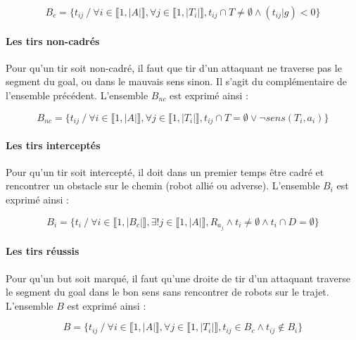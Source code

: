 \documentclass{article}
\begin{document}
\begin{equation*}
    B_c = \{ t_{ij} \ / \ \forall i \in \llbracket 1, |A| \rrbracket, \forall j \in \llbracket 1, |T_i| \rrbracket, t_{ij} \cap T \ne \emptyset \wedge (t_{ij}|g) < 0  \}
\end{equation*}


\paragraph{Les tirs non-cadrés}
Pour qu'un tir soit non-cadré, il faut que tir d'un attaquant ne traverse pas le segment du goal, ou dans le mauvais sens sinon. Il s'agit du complémentaire de l'ensemble précédent. L'ensemble $B_{nc}$ est exprimé ainsi :

\begin{equation*}
    B_{nc} = \{ t_{ij} \ / \ \forall i \in \llbracket 1, |A| \rrbracket, \forall j \in \llbracket 1, |T_i| \rrbracket, t_{ij} \cap T = \emptyset \vee \neg sens(T_i, a_i) \}
\end{equation*}

\paragraph{Les tirs interceptés}
Pour qu'un tir soit intercepté, il doit dans un premier temps être cadré et rencontrer un obstacle sur le chemin (robot allié ou adverse). L'ensemble $B_i$ est exprimé ainsi :

\begin{equation*}
    B_i = \{  t_i \ / \ \forall i \in \llbracket 1, |B_c| \rrbracket, \exists ! j \in \llbracket 1, |A| \rrbracket, R_{a_j} \wedge t_i \ne \emptyset \wedge t_i \cap D = \emptyset \}
\end{equation*}



\paragraph{Les tirs réussis}
Pour qu'un but soit marqué, il faut qu'une droite de tir d'un attaquant traverse le segment du goal dans le bon sens sans rencontrer de robots sur le trajet. L'ensemble $B$ est exprimé ainsi :

\begin{equation*}
    B = \{t_{ij} \ / \ \forall i \in \llbracket 1, |A| \rrbracket, \forall j \in \llbracket 1, |T_i| \rrbracket, t_{ij}  \in B_c \wedge t_{ij} \notin B_i  \}
\end{equation*}
\end{document}
